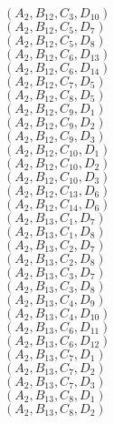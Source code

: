 \documentclass[14pt]{article}
\begin{document}
    $({A}_{2}, {B}_{12}, {C}_{3}, {D}_{10}) $ \\ 
    $({A}_{2}, {B}_{12}, {C}_{5}, {D}_{7}) $ \\ 
    $({A}_{2}, {B}_{12}, {C}_{5}, {D}_{8}) $ \\ 
    $({A}_{2}, {B}_{12}, {C}_{6}, {D}_{13}) $ \\ 
    $({A}_{2}, {B}_{12}, {C}_{6}, {D}_{14}) $ \\ 
    $({A}_{2}, {B}_{12}, {C}_{7}, {D}_{5}) $ \\ 
    $({A}_{2}, {B}_{12}, {C}_{8}, {D}_{5}) $ \\ 
    $({A}_{2}, {B}_{12}, {C}_{9}, {D}_{1}) $ \\ 
    $({A}_{2}, {B}_{12}, {C}_{9}, {D}_{2}) $ \\ 
    $({A}_{2}, {B}_{12}, {C}_{9}, {D}_{3}) $ \\ 
    $({A}_{2}, {B}_{12}, {C}_{10}, {D}_{1}) $ \\ 
    $({A}_{2}, {B}_{12}, {C}_{10}, {D}_{2}) $ \\ 
    $({A}_{2}, {B}_{12}, {C}_{10}, {D}_{3}) $ \\ 
    $({A}_{2}, {B}_{12}, {C}_{13}, {D}_{6}) $ \\ 
    $({A}_{2}, {B}_{12}, {C}_{14}, {D}_{6}) $ \\ 
    $({A}_{2}, {B}_{13}, {C}_{1}, {D}_{7}) $ \\ 
    $({A}_{2}, {B}_{13}, {C}_{1}, {D}_{8}) $ \\ 
    $({A}_{2}, {B}_{13}, {C}_{2}, {D}_{7}) $ \\ 
    $({A}_{2}, {B}_{13}, {C}_{2}, {D}_{8}) $ \\ 
    $({A}_{2}, {B}_{13}, {C}_{3}, {D}_{7}) $ \\ 
    $({A}_{2}, {B}_{13}, {C}_{3}, {D}_{8}) $ \\ 
    $({A}_{2}, {B}_{13}, {C}_{4}, {D}_{9}) $ \\ 
    $({A}_{2}, {B}_{13}, {C}_{4}, {D}_{10}) $ \\ 
    $({A}_{2}, {B}_{13}, {C}_{6}, {D}_{11}) $ \\ 
    $({A}_{2}, {B}_{13}, {C}_{6}, {D}_{12}) $ \\ 
    $({A}_{2}, {B}_{13}, {C}_{7}, {D}_{1}) $ \\ 
    $({A}_{2}, {B}_{13}, {C}_{7}, {D}_{2}) $ \\ 
    $({A}_{2}, {B}_{13}, {C}_{7}, {D}_{3}) $ \\ 
    $({A}_{2}, {B}_{13}, {C}_{8}, {D}_{1}) $ \\ 
    $({A}_{2}, {B}_{13}, {C}_{8}, {D}_{2}) $ \\ 
\end{document}

